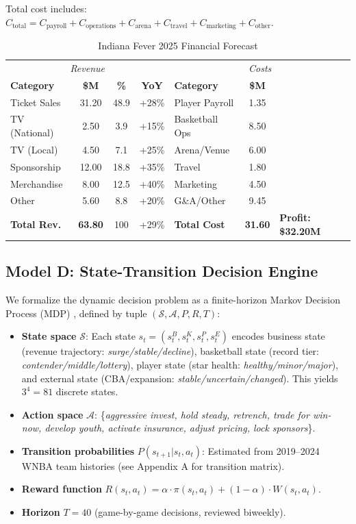 \documentclass{mcmthesis}
\begin{document}
Total cost includes: $C_{\text{total}} = C_{\text{payroll}} + C_{\text{operations}} + C_{\text{arena}} + C_{\text{travel}} + C_{\text{marketing}} + C_{\text{other}}$.

\begin{table}[H]
\centering
\caption{Indiana Fever 2025 Financial Forecast}
\small
\begin{tabular}{lccc|lccc}
\toprule
\multicolumn{4}{c|}{\textit{Revenue}} & \multicolumn{4}{c}{\textit{Costs}} \\
\textbf{Category} & \textbf{\$M} & \textbf{\%} & \textbf{YoY} & \textbf{Category} & \textbf{\$M} & & \\
\midrule
Ticket Sales & 31.20 & 48.9 & +28\% & Player Payroll & 1.35 & & \\
TV (National) & 2.50 & 3.9 & +15\% & Basketball Ops & 8.50 & & \\
TV (Local) & 4.50 & 7.1 & +25\% & Arena/Venue & 6.00 & & \\
Sponsorship & 12.00 & 18.8 & +35\% & Travel & 1.80 & & \\
Merchandise & 8.00 & 12.5 & +40\% & Marketing & 4.50 & & \\
Other & 5.60 & 8.8 & +20\% & G\&A/Other & 9.45 & & \\
\midrule
\textbf{Total Rev.} & \textbf{63.80} & 100 & +29\% & \textbf{Total Cost} & \textbf{31.60} & \multicolumn{2}{l}{\textbf{Profit: \$32.20M}} \\
\bottomrule
\end{tabular}
\end{table}

\subsection{Model D: State-Transition Decision Engine}
We formalize the dynamic decision problem as a finite-horizon Markov Decision Process (MDP) \cite{puterman1994}, defined by tuple $(\mathcal{S}, \mathcal{A}, P, R, T)$:

\begin{itemize}
\item \textbf{State space} $\mathcal{S}$: Each state $s_t = (s_t^B, s_t^K, s_t^P, s_t^E)$ encodes business state (revenue trajectory: \textit{surge/stable/decline}), basketball state (record tier: \textit{contender/middle/lottery}), player state (star health: \textit{healthy/minor/major}), and external state (CBA/expansion: \textit{stable/uncertain/changed}). This yields $3^4 = 81$ discrete states.
\item \textbf{Action space} $\mathcal{A}$: \{\textit{aggressive invest, hold steady, retrench, trade for win-now, develop youth, activate insurance, adjust pricing, lock sponsors}\}.
\item \textbf{Transition probabilities} $P(s_{t+1} | s_t, a_t)$: Estimated from 2019--2024 WNBA team histories (see Appendix A for transition matrix).
\item \textbf{Reward function} $R(s_t, a_t) = \alpha \cdot \pi(s_t, a_t) + (1-\alpha) \cdot W(s_t, a_t)$.
\item \textbf{Horizon} $T = 40$ (game-by-game decisions, reviewed biweekly).
\end{itemize}
\end{document}
